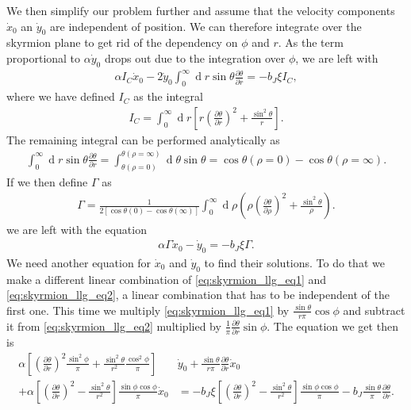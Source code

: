 \documentclass[1p]{elsarticle}		%
\renewcommand{\d}[1]{\ensuremath{\operatorname{d}\!{#1}}}
\numberwithin{equation}{section}
\begin{document}
We then simplify our problem further and assume that the velocity components $\dot{x}_0$ an $\dot{y}_0$ are independent of position. We can therefore integrate over the skyrmion plane to get rid of the dependency on $\phi$ and $r$. As the term proportional to $\alpha\dot{y}_0$ drops out due to the integration over $\phi$, we are left with
\begin{align}
\alpha I_C \dot{x}_0 - 2\dot{y}_0\int_0^{\infty}\d r \sin\theta\frac{\partial\theta}{\partial r} = -b_J\xi I_C,
\end{align}
where we have defined $I_C$ as the integral
\begin{align}
I_C = \int_0^{\infty} \d r \left[ r(\frac{\partial\theta}{\partial r})^2 + \frac{\sin^2\theta}{r}\right] .
\end{align}
The remaining integral can be performed analytically as
\begin{align}
\int_0^{\infty}\d r \sin\theta \frac{\partial\theta}{\partial r} = \int_{\theta(\rho =0)}^{\theta(\rho = \infty)}\d \theta \sin\theta = \cos\theta(\rho = 0) - \cos\theta (\rho = \infty).
\end{align}
If we then define $\Gamma$ as
\begin{align}
\label{eq:Gamma}
\Gamma = \frac{1}{2[\cos\theta(0)-\cos\theta(\infty)]}\int_0^{\infty}\d \rho (\rho (\frac{\partial \theta}{\partial \rho})^2+\frac{\sin^2\theta}{\rho}).
\end{align}
we are left with the equation
\begin{align}
\label{eq:skyrmion_xy_eq1}
\alpha\Gamma \dot{x}_0 - \dot{y}_0 = -b_J\xi\Gamma.
\end{align}
We need another equation for $\dot{x}_0$ and $\dot{y}_0$ to find their solutions. To do that we make a different linear combination of \eqref{eq:skyrmion_llg_eq1} and \eqref{eq:skyrmion_llg_eq2}, a linear combination that has to be independent of the first one. This time we multiply \eqref{eq:skyrmion_llg_eq1} by $\frac{\sin\theta}{r \pi}\cos\phi$ and subtract it from \eqref{eq:skyrmion_llg_eq2} multiplied by $\frac{1}{\pi}\frac{\partial\theta}{\partial r}\sin\phi$. The equation we get then is
\begin{align}
\nonumber \alpha\left[ (\frac{\partial\theta}{\partial r})^2\frac{\sin^2\phi}{\pi} + \frac{\sin^2\theta}{r^2}\frac{\cos^2\phi}{\pi}\right] &\dot{y}_0 + \frac{\sin\theta}{r \pi}\frac{\partial\theta}{\partial r}\dot{x}_0 \\
+ \alpha \left[(\frac{\partial\theta}{\partial r})^2-\frac{\sin^2\theta}{r^2}\right]\frac{\sin\phi\cos\phi}{\pi}\dot{x}_0
&= -b_J\xi\left[ (\frac{\partial\theta}{\partial r})^2 - \frac{\sin^2\theta}{r^2}\right]\frac{\sin\phi\cos\phi}{\pi} - b_J\frac{\sin\theta}{\pi}\frac{\partial\theta}{\partial r}.
\end{align}
\end{document}
